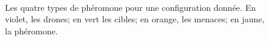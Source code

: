 \documentclass[12pt]{article}
\begin{document}
\begin{figure}[p]
  \centering

  \mbox{
  }
  \mbox{
  }

  \caption{Les quatre types de phéromone pour une configuration
    donnée. En violet, les drones; en vert les cibles; en orange, les
    menaces; en jaune, la phéromone.}
  \label{pheromones}
\end{figure}
\end{document}
